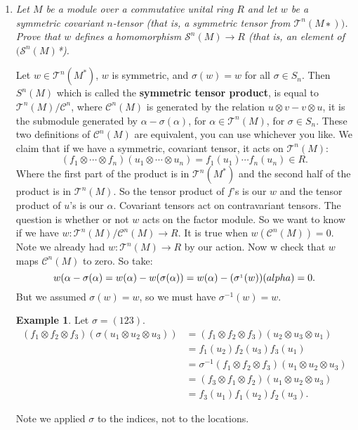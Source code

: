 \documentclass[9pt,reqno,twoside]{amsbook}
\theoremstyle{plain}
\numberwithin{section}{chapter}
\numberwithin{equation}{chapter}
\theoremstyle{definition}
\newtheorem{Ex}[theorem]{Example}
\theoremstyle{remark}
\theoremstyle{plain}
\newcommand{\mc}{\mathcal}
\newcommand{\bee}{\begin{equation}\begin{aligned}}
\newcommand{\eee}{\end{aligned}\end{equation}}
\newcommand{\tens}{\otimes}
\newcommand{\Tau}{\mc{T}}
\begin{document}
\begin{enumerate}[label=\arabic*.]
\begin{comment}
\end{comment}


















\setcounter{enumi}{4}

\item \textit{Let
$M$
be a module over a commutative unital ring
$R$
and let
$w$
be a symmetric covariant
$n$-tensor (that is, a symmetric tensor from
$\Tau^n
(
M
∗
))$. Prove that
$w$
defines a homomorphism
$\mc{S}^n(M) \to R$
(that is, an element of $(
\mc{S}^n(M)$*).}

Let $w \in \Tau^n(M^*)$, $w$ is symmetric, and $\sigma(w) = w$ for all $\sigma \in S_n$. Then $S^n(M)$ which is called the \textbf{symmetric tensor product}, is equal to $\Tau^n(M)/\mc{C}^n$, where $\mc{C}^n(M)$ is generated by the relation $u \tens v - v \tens u$, it is the submodule generated by $\alpha - \sigma(\alpha)$, for $\alpha \in \Tau^n(M)$, for $\sigma \in S_n$. These two definitions of $\mc{C}^n(M)$ are equivalent, you can use whichever you like. We claim that if we have a symmetric, covariant tensor, it acts on $\Tau^n(M)$:
$$
(f_1 \tens \cdots \tens f_n)(u_1 \tens \cdots \tens u_n) = f_1(u_1)\cdots f_n(u_n) \in R.
$$
Where the first part of the product is in $\Tau^n(M^*)$ and the second half of the product is in $\Tau^n(M)$. So the tensor product of $f$'s is our $w$ and the tensor product of $u$'s is our $\alpha$. 
Covariant tensors act on contravariant tensors. The question is whether or not $w$ acts on the factor module. So we want to know if we have $w:\Tau^n(M)/\mc{C}^n(M) \to R$. It is true when $w(\mc{C}^n(M)) = 0$. Note we already had $w:\Tau^n(M) \to R$ by our action. Now w check that $w$ maps $\mc{C}^n(M)$ to zero. So take:
$$
w(\alpha - \sigma(\alpha) = w(\alpha) - w(\sigma(\alpha)) = w(\alpha) - (\sigma^{_1}(w))(\\alpha) = 0. 
$$
But we assumed $\sigma(w) = w$, so we must have $\sigma^{-1}(w) = w$. 

\begin{Ex}
Let $\sigma = (123)$. 
\bee
(f_1 \tens f_2 \tens f_3)(\sigma(u_1 \tens u_2 \tens u_3)) &= (f_1 \tens f_2 \tens f_3)(u_2 \tens u_3 \tens u_1) \\
&= f_1(u_2)f_2(u_3)f_3(u_1)\\
&= \sigma^{-1}(f_1 \tens f_2 \tens f_3)(u_1 \tens u_2 \tens u_3)\\
&= (f_3 \tens f_1 \tens f_2)(u_1 \tens u_2 \tens u_3)\\
&= f_3(u_1)f_1(u_2)f_2(u_3).
\eee
\end{Ex}
Note we applied $\sigma$ to the indices, not to the locations. 


\end{enumerate}
\end{document}
